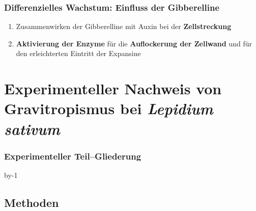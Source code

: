 \documentclass[aspectratio=169
]{beamer}
\makeatletter
\newcommand{\trickbeamer}{%
	\advance\beamer@slideinframe by-1%
}%
\makeatother
\begin{document}
\begin{frame}[<+(1)->]
\frametitle{Differenzielles Wachstum: Einfluss der Gibberelline}
\begin{enumerate}
	\item Zusammenwirken der Gibberelline mit Auxin bei der \textbf{Zellstreckung}
	\item \textbf{Aktivierung der Enzyme} für die \textbf{Auflockerung der Zellwand} und für den erleichterten Eintritt der Expansine
\end{enumerate}
\end{frame}

\section{Experimenteller Nachweis von Gravitropismus bei \protect\emph{Lepidium sativum}}
	
\begin{frame}[<+(1)->]
\frametitle{Experimenteller Teil--Gliederung}
\pause
\trickbeamer		
\tableofcontents[currentsection, sections=2, pausesections, pausesubsections, subsectionstyle=show/show/shaded, subsubsectionstyle=show/show/show/shaded]
		



\end{frame}	
	
	\subsection{Methoden}
	
	
\end{document}

